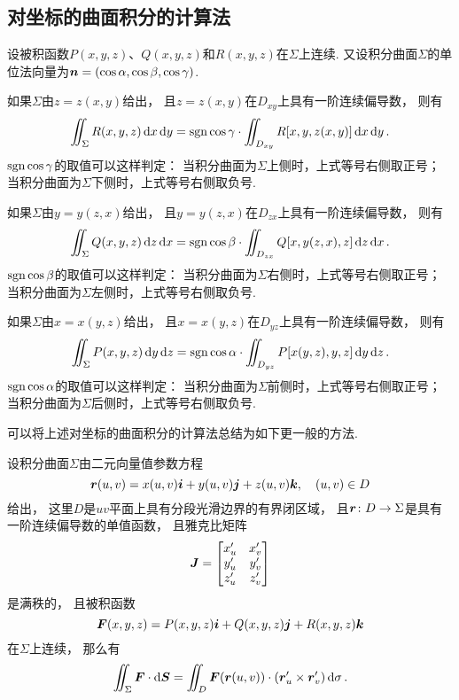 \subsection{对坐标的曲面积分的计算法}
\begin{theorem}
设被积函数\(P(x,y,z)\)、\(Q(x,y,z)\)和\(R(x,y,z)\)在\(\Sigma\)上连续.
又设积分曲面\(\Sigma\)的单位法向量为\(\boldsymbol{n} = (\cos\alpha,\cos\beta,\cos\gamma)\).

如果\(\Sigma\)由\(z=z(x,y)\)给出，
且\(z=z(x,y)\)在\(D_{xy}\)上具有一阶连续偏导数，
则有\begin{equation}\label{equation:线积分与面积分.第二类曲面积分的计算式1}
	\iint_\Sigma R(x,y,z) \dd{x}\dd{y}
	= \operatorname{sgn}\cos\gamma \cdot \iint_{D_{xy}} R[x,y,z(x,y)] \dd{x}\dd{y}.
\end{equation}
\(\operatorname{sgn}\cos\gamma\)的取值可以这样判定：
当积分曲面为\(\Sigma\)上侧时，上式等号右侧取正号；
当积分曲面为\(\Sigma\)下侧时，上式等号右侧取负号.

如果\(\Sigma\)由\(y=y(z,x)\)给出，
且\(y=y(z,x)\)在\(D_{zx}\)上具有一阶连续偏导数，
则有\begin{equation}\label{equation:线积分与面积分.第二类曲面积分的计算式2}
	\iint_\Sigma Q(x,y,z) \dd{z}\dd{x}
	= \operatorname{sgn}\cos\beta \cdot \iint_{D_{zx}} Q[x,y(z,x),z] \dd{z}\dd{x}.
\end{equation}
\(\operatorname{sgn}\cos\beta\)的取值可以这样判定：
当积分曲面为\(\Sigma\)右侧时，上式等号右侧取正号；
当积分曲面为\(\Sigma\)左侧时，上式等号右侧取负号.

如果\(\Sigma\)由\(x=x(y,z)\)给出，
且\(x=x(y,z)\)在\(D_{yz}\)上具有一阶连续偏导数，
则有\begin{equation}\label{equation:线积分与面积分.第二类曲面积分的计算式3}
	\iint_\Sigma P(x,y,z) \dd{y}\dd{z}
	= \operatorname{sgn}\cos\alpha \cdot \iint_{D_{yz}} P[x(y,z),y,z] \dd{y}\dd{z}.
\end{equation}
\(\operatorname{sgn}\cos\alpha\)的取值可以这样判定：
当积分曲面为\(\Sigma\)前侧时，上式等号右侧取正号；
当积分曲面为\(\Sigma\)后侧时，上式等号右侧取负号.
\end{theorem}

可以将上述对坐标的曲面积分的计算法总结为如下更一般的方法.
\begin{theorem}
设积分曲面\(\Sigma\)由二元向量值参数方程\[
	\boldsymbol{r}(u,v) = x(u,v) \boldsymbol{i} + y(u,v) \boldsymbol{j} + z(u,v) \boldsymbol{k},
	\quad (u,v) \in D
\]给出，
这里\(D\)是\(uv\)平面上具有分段光滑边界的有界闭区域，
且\(\boldsymbol{r}\colon D \to \Sigma\)是具有一阶连续偏导数的单值函数，
且雅克比矩阵\[
	\boldsymbol{J} = \begin{bmatrix}
		x'_u & x'_v \\
		y'_u & y'_v \\
		z'_u & z'_v
	\end{bmatrix}
\]是满秩的，
且被积函数\[
	\boldsymbol{F}(x,y,z) = P(x,y,z) \boldsymbol{i} + Q(x,y,z) \boldsymbol{j} + R(x,y,z) \boldsymbol{k}
\]在\(\Sigma\)上连续，
那么有\begin{equation}
	\iint_\Sigma \boldsymbol{F} \cdot \dd{\boldsymbol{S}}
	= \iint_D \boldsymbol{F}(\boldsymbol{r}(u,v)) \cdot (\boldsymbol{r}'_u \times \boldsymbol{r}'_v) \dd{\sigma}.
\end{equation}
\end{theorem}

